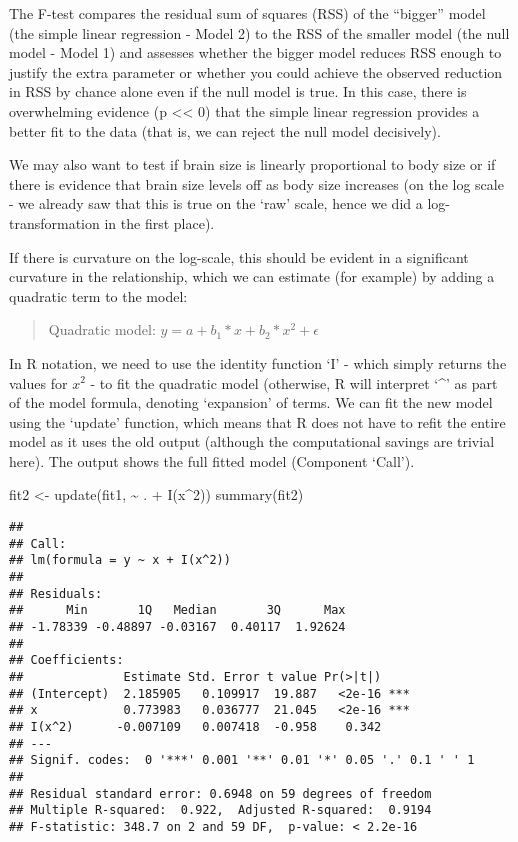\documentclass[
]{article}
\newenvironment{Shaded}{\begin{snugshade}}{\end{snugshade}}
\newcommand{\DecValTok}[1]{\textcolor[rgb]{0.00,0.00,0.81}{#1}}
\newcommand{\FunctionTok}[1]{\textcolor[rgb]{0.00,0.00,0.00}{#1}}
\newcommand{\NormalTok}[1]{#1}
\newcommand{\OtherTok}[1]{\textcolor[rgb]{0.56,0.35,0.01}{#1}}
\newcommand{\SpecialCharTok}[1]{\textcolor[rgb]{0.00,0.00,0.00}{#1}}
\begin{document}
The F-test compares the residual sum of squares (RSS) of the ``bigger''
model (the simple linear regression - Model 2) to the RSS of the smaller
model (the null model - Model 1) and assesses whether the bigger model
reduces RSS enough to justify the extra parameter or whether you could
achieve the observed reduction in RSS by chance alone even if the null
model is true. In this case, there is overwhelming evidence (p
\textless\textless{} 0) that the simple linear regression provides a
better fit to the data (that is, we can reject the null model
decisively).

We may also want to test if brain size is linearly proportional to body
size or if there is evidence that brain size levels off as body size
increases (on the log scale - we already saw that this is true on the
`raw' scale, hence we did a log-transformation in the first place).

If there is curvature on the log-scale, this should be evident in a
significant curvature in the relationship, which we can estimate (for
example) by adding a quadratic term to the model:

\begin{quote}
Quadratic model: \(y = a + b_{1} * x + b_2 * x^{2} + \epsilon\)
\end{quote}

In R notation, we need to use the identity function `I' - which simply
returns the values for \(x^{2}\) - to fit the quadratic model
(otherwise, R will interpret `\^{}' as part of the model formula,
denoting `expansion' of terms. We can fit the new model using the
`update' function, which means that R does not have to refit the entire
model as it uses the old output (although the computational savings are
trivial here). The output shows the full fitted model (Component
`Call').

\begin{Shaded}
\begin{Highlighting}[]
\NormalTok{fit2 }\OtherTok{\textless{}{-}} \FunctionTok{update}\NormalTok{(fit1, }\SpecialCharTok{\textasciitilde{}}\NormalTok{ . }\SpecialCharTok{+} \FunctionTok{I}\NormalTok{(x}\SpecialCharTok{\^{}}\DecValTok{2}\NormalTok{))   }
\FunctionTok{summary}\NormalTok{(fit2)}
\end{Highlighting}
\end{Shaded}

\begin{verbatim}
## 
## Call:
## lm(formula = y ~ x + I(x^2))
## 
## Residuals:
##      Min       1Q   Median       3Q      Max 
## -1.78339 -0.48897 -0.03167  0.40117  1.92624 
## 
## Coefficients:
##              Estimate Std. Error t value Pr(>|t|)    
## (Intercept)  2.185905   0.109917  19.887   <2e-16 ***
## x            0.773983   0.036777  21.045   <2e-16 ***
## I(x^2)      -0.007109   0.007418  -0.958    0.342    
## ---
## Signif. codes:  0 '***' 0.001 '**' 0.01 '*' 0.05 '.' 0.1 ' ' 1
## 
## Residual standard error: 0.6948 on 59 degrees of freedom
## Multiple R-squared:  0.922,  Adjusted R-squared:  0.9194 
## F-statistic: 348.7 on 2 and 59 DF,  p-value: < 2.2e-16
\end{verbatim}
\end{document}
